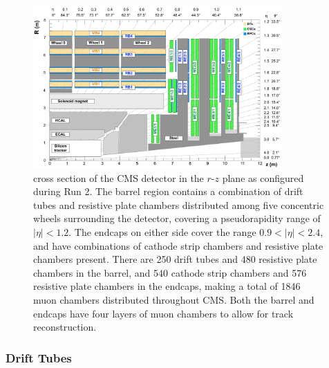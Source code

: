 \begin{figure}[htbp]
  \centering
  \includegraphics[width=0.85\textwidth]{fig/experiment/cms_crosssec.pdf}
  \caption{
    cross section of the CMS detector in the $r$-$z$ plane as configured during Run 2.
    The barrel region contains a combination of drift tubes and resistive plate chambers distributed among five concentric wheels surrounding the detector, covering a pseudorapidity range of $|\eta|<1.2$.
    The endcaps on either side cover the range $0.9<|\eta|<2.4$, and have combinations of cathode strip chambers and resistive plate chambers present.
    There are 250 drift tubes and 480 resistive plate chambers in the barrel, and 540 cathode strip chambers and 576 resistive plate chambers in the endcaps, making a total of 1846 muon chambers distributed throughout CMS.
    Both the barrel and endcaps have four layers of muon chambers to allow for track reconstruction.
  }
  \label{fig:CMScrosssec}
\end{figure}

\subsubsection{Drift Tubes}


